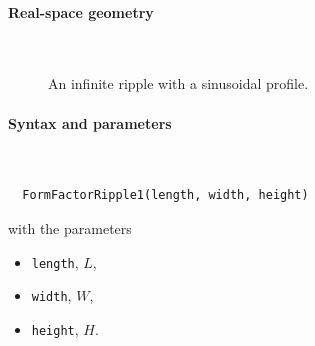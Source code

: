  \label{SRipple1}

\paragraph{Real-space geometry}\strut\\

\begin{figure}[H]
\hfill
{}
\hfill
{}
\hfill
{}
\hfill
\caption{An infinite ripple with a sinusoidal profile.}
\end{figure}

\paragraph{Syntax and parameters}\strut\\[-2ex plus .2ex minus .2ex]
\begin{lstlisting}
  FormFactorRipple1(length, width, height)
\end{lstlisting}
with the parameters
\begin{itemize}
\item \texttt{length}, $L$,
\item \texttt{width}, $W$,
\item \texttt{height}, $H$.
\end{itemize}

